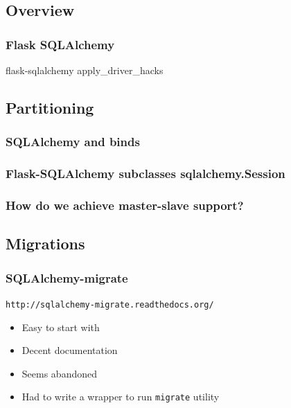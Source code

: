 \documentclass{beamer}
\begin{document}
\subsection{Overview}

\begin{frame}
  \frametitle{Flask SQLAlchemy}
  flask-sqlalchemy
  apply\_driver\_hacks
\end{frame}

\subsection{Partitioning}

\begin{frame}
  \frametitle{SQLAlchemy and binds}
\end{frame}

\begin{frame}
  \frametitle{Flask-SQLAlchemy subclasses sqlalchemy.Session}
  
\end{frame}

\begin{frame}
  \frametitle{How do we achieve master-slave support?}
\end{frame}

\subsection{Migrations}

\begin{frame}
  \frametitle{SQLAlchemy-migrate}
  \texttt{http://sqlalchemy-migrate.readthedocs.org/}
  \begin{itemize}
  \item Easy to start with
  \item Decent documentation
  \item Seems abandoned
  \item Had to write a wrapper to run \texttt{migrate} utility
  \end{itemize}
\end{frame}
\end{document}
